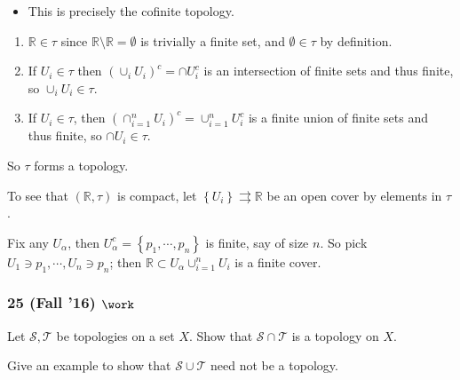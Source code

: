 \begin{concept}

\envlist

\begin{itemize}
\tightlist
\item
  This is precisely the cofinite topology.
\end{itemize}

\end{concept}

\begin{solution}

\envlist

\begin{enumerate}
\def\labelenumi{\arabic{enumi}.}
\tightlist
\item
  \({\mathbb{R}}\in \tau\) since
  \({\mathbb{R}}\setminus {\mathbb{R}}= \emptyset\) is trivially a
  finite set, and \(\emptyset \in \tau\) by definition.
\item
  If \(U_i \in \tau\) then \((\cup_i U_i)^c = \cap U_i^c\) is an
  intersection of finite sets and thus finite, so
  \(\cup_i U_i \in \tau\).
\item
  If \(U_i \in \tau\), then
  \((\cap_{i=1}^n U_i)^c = \cup_{i=1}^n U_i^c\) is a finite union of
  finite sets and thus finite, so \(\cap U_i \in \tau\).
\end{enumerate}

So \(\tau\) forms a topology.

To see that \(({\mathbb{R}}, \tau)\) is compact, let
\(\left\{{U_i}\right\} \rightrightarrows {\mathbb{R}}\) be an open cover
by elements in \(\tau\).

Fix any \(U_\alpha\), then
\(U_\alpha^c = \left\{{p_1, \cdots, p_n}\right\}\) is finite, say of
size \(n\). So pick \(U_1 \ni p_1, \cdots, U_n \ni p_n\); then
\({\mathbb{R}}\subset U_\alpha \cup_{i=1}^n U_i\) is a finite cover.

\end{solution}

\hypertarget{fall-16-work}{%
\subsubsection{\texorpdfstring{25 (Fall '16)
\(\work\)}{25 (Fall '16) \textbackslash work}}\label{fall-16-work}}

\begin{problem}[?]

Let \({\mathcal{S}}, {\mathcal{T}}\) be topologies on a set \(X\). Show
that \({\mathcal{S}}\cap {\mathcal{T}}\) is a topology on \(X\).

Give an example to show that \({\mathcal{S}}\cup {\mathcal{T}}\) need
not be a topology.

\end{problem}

